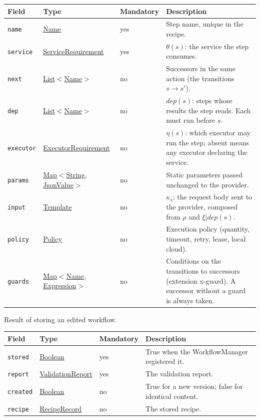 \documentclass[a4paper]{arrowhead}
\newcommand{\mref}[1]{{\textcolor{ArrowheadPurple}{\hyperref[sec:model:#1]{#1}}}}
\newcommand{\pref}[1]{{\textcolor{ArrowheadGrey}{\hyperref[sec:model:primitives:#1]{#1}}}}
\begin{document}
{\small
\begin{longtable}{|p{3.7cm}|p{4.2cm}|p{1.6cm}|p{6.3cm}|}

\hline
\rowcolor{gray!33} Field & Type & Mandatory & Description \\ \hline
\endhead
\texttt{name} & \pref{Name} & yes & Step name, unique in the recipe. \\ \hline
\texttt{service} & \mref{ServiceRequirement} & yes & $\theta(s)$: the service the step consumes. \\ \hline
\texttt{next} & \pref{List}$<$\pref{Name}$>$ & no & Successors in the same action (the transitions $s \rightarrow s'$). \\ \hline
\texttt{dep} & \pref{List}$<$\pref{Name}$>$ & no & $dep(s)$: steps whose results the step reads. Each must run before $s$. \\ \hline
\texttt{executor} & \mref{ExecutorRequirement} & no & $\eta(s)$: which executor may run the step; absent means any executor declaring the service. \\ \hline
\texttt{params} & \pref{Map}$<$\pref{String}, \pref{JsonValue}$>$ & no & Static parameters passed unchanged to the provider. \\ \hline
\texttt{input} & \pref{Template} & no & $\kappa_s$: the request body sent to the provider, composed from $\rho$ and $\xi|dep(s)$. \\ \hline
\texttt{policy} & \mref{Policy} & no & Execution policy (quantity, timeout, retry, lease, local cloud). \\ \hline
\texttt{guards} & \pref{Map}$<$\pref{Name}, \pref{Expression}$>$ & no & Conditions on the transitions to successors (extension x-guard). A successor without a guard is always taken. \\ \hline
\end{longtable}
}

Result of storing an edited workflow.

{\small
\begin{longtable}{|p{3.7cm}|p{4.2cm}|p{1.6cm}|p{6.3cm}|}

\hline
\rowcolor{gray!33} Field & Type & Mandatory & Description \\ \hline
\endhead
\texttt{stored} & \pref{Boolean} & yes & True when the WorkflowManager registered it. \\ \hline
\texttt{report} & \mref{ValidationReport} & yes & The validation report. \\ \hline
\texttt{created} & \pref{Boolean} & no & True for a new version; false for identical content. \\ \hline
\texttt{recipe} & \mref{RecipeRecord} & no & The stored recipe. \\ \hline
\end{longtable}
}
\end{document}
